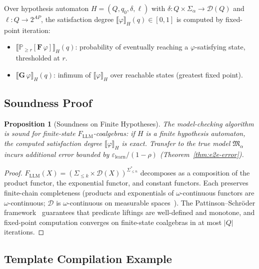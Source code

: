 \documentclass[11pt]{article}
\newtheorem{proposition}[theorem]{Proposition}
\newcommand{\DD}{\mathcal{D}}
\begin{document}
Over hypothesis automaton $H = (Q, q_0, \delta, \ell)$ with
$\delta: Q \times \Sigma_\alpha \to \DD(Q)$ and
$\ell: Q \to 2^{\mathit{AP}}$, the satisfaction degree
$\llbracket \varphi \rrbracket_H(q) \in [0,1]$ is computed by
fixed-point iteration:
\begin{itemize}[nosep,leftmargin=*]
\item $\llbracket \mathbb{P}_{\ge r}[\mathbf{F}\,\varphi]
  \rrbracket_H(q)$: probability of eventually reaching a
  $\varphi$-satisfying state, thresholded at $r$.
\item $\llbracket \mathbf{G}\,\varphi \rrbracket_H(q)$: infimum of
  $\llbracket \varphi \rrbracket_H$ over reachable states (greatest
  fixed point).
\end{itemize}

\subsection{Soundness Proof}\label{app:qctlf-soundness}

\begin{proposition}[Soundness on Finite Hypotheses]
The model-checking algorithm is sound for finite-state
$F_{\mathrm{LLM}}$-coalgebras: if $H$ is a finite hypothesis
automaton, the computed satisfaction degree
$\llbracket \varphi \rrbracket_H$ is exact.  Transfer to the
true model $\mathfrak{M}_\alpha$ incurs additional error bounded by
$\varepsilon_{\mathrm{learn}}/(1-\rho)$ (Theorem~\ref{thm:e2e-error}).
\end{proposition}

\begin{proof}
$F_{\mathrm{LLM}}(X) = (\Sigma_{\le k} \times \DD(X))^{\Sigma^*_{\le n}}$
decomposes as a composition of the product functor, the exponential
functor, and constant functors.  Each preserves finite-chain
completeness (products and exponentials of $\omega$-continuous functors
are $\omega$-continuous; $\DD$ is $\omega$-continuous on measurable
spaces~\cite{jacobs2016introduction}).  The Pattinson--Schr\"oder
framework~\cite{pattinson2008coalgebraic} guarantees that predicate
liftings are well-defined and monotone, and fixed-point computation
converges on finite-state coalgebras in at most $|Q|$ iterations.
\end{proof}

\subsection{Template Compilation Example}
\end{document}
